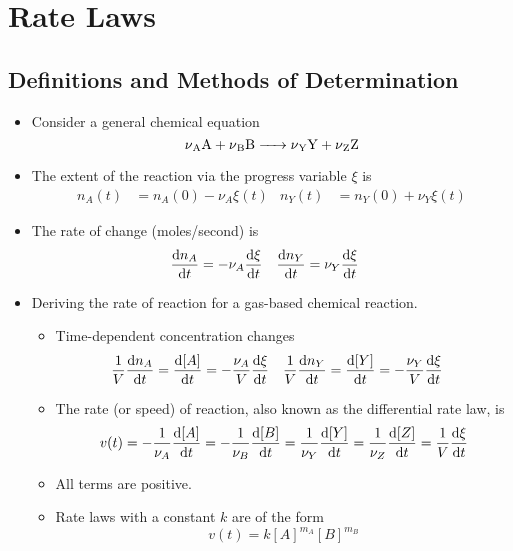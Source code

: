 \documentclass[../notes.tex]{subfiles}
\begin{document}
\chapter{Rate Laws}
\section{Definitions and Methods of Determination}
\begin{itemize}
    \item {}Consider a general chemical equation
    \begin{equation*}
        \ce{\nu_AA + \nu_BB -> \nu_YY + \nu_ZZ}
    \end{equation*}
    \item The extent of the reaction via the progress variable $\xi$ is
    \begin{align*}
        n_A(t) &= n_A(0)-\nu_A\xi(t)&
        n_Y(t) &= n_Y(0)+\nu_Y\xi(t)
    \end{align*}
    \item The rate of change (moles/second) is
    \begin{align*}
        \dv{n_A}{t} &= -\nu_A\dv{\xi}{t}&
        \dv{n_Y}{t} &= \nu_Y\dv{\xi}{t}
    \end{align*}
    \item Deriving the rate of reaction for a gas-based chemical reaction.
    \begin{itemize}
        \item Time-dependent concentration changes
        \begin{align*}
            \frac{1}{V}\dv{n_A}{t} &= \dv{[A]}{t} = -\frac{\nu_A}{V}\dv{\xi}{t}&
            \frac{1}{V}\dv{n_Y}{t} &= \dv{[Y]}{t} = -\frac{\nu_Y}{V}\dv{\xi}{t}
        \end{align*}
        \item The rate (or speed) of reaction, also known as the differential rate law, is
        \begin{equation*}
            v(t) = -\frac{1}{\nu_A}\dv{[A]}{t}
            = -\frac{1}{\nu_B}\dv{[B]}{t}
            = \frac{1}{\nu_Y}\dv{[Y]}{t}
            = \frac{1}{\nu_Z}\dv{[Z]}{t}
            = \frac{1}{V}\dv{\xi}{t}
        \end{equation*}
        \item All terms are positive.
        \item Rate laws with a constant $k$ are of the form
        \begin{equation*}
            v(t) = k[A]^{m_A}[B]^{m_B}

\end{equation*}
\end{itemize}
\end{itemize}
\end{document}
